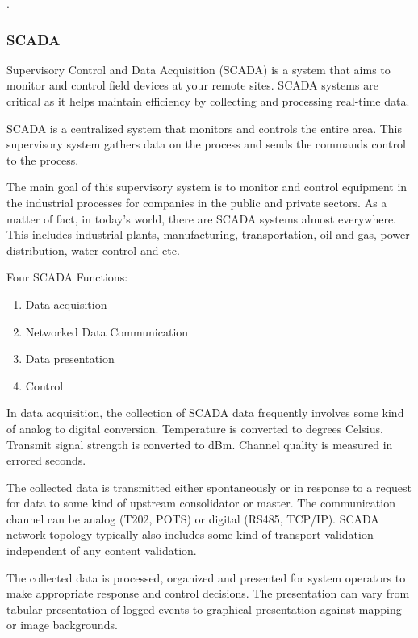  \citep{spadaforaDesigningBehaviorInteractive2016}.

\subsubsection{SCADA}

Supervisory Control and Data Acquisition (SCADA) is a system that aims to monitor and control field devices at your remote sites. SCADA systems are critical as it helps maintain efficiency by collecting and processing real-time data.

SCADA is a centralized system that monitors and controls the entire area. This supervisory system gathers data on the process and sends the commands control to the process.

The main goal of this supervisory system is to monitor and control equipment in the industrial processes for companies in the public and private sectors. As a matter of fact, in today's world, there are SCADA systems almost everywhere. This includes industrial plants, manufacturing, transportation, oil and gas, power distribution, water control and etc.

Four SCADA Functions:

\begin{enumerate}
	\item Data acquisition
	\item Networked Data Communication
	\item Data presentation
	\item Control
\end{enumerate}

In data acquisition, the collection of SCADA data frequently involves some kind of analog to digital conversion. Temperature is converted to degrees Celsius. Transmit signal strength is converted to dBm. Channel quality is measured in errored seconds. 

The collected data is transmitted either spontaneously or in response to a request for data to some kind of upstream consolidator or master. The communication channel can be analog (T202, POTS) or digital (RS485, TCP/IP). SCADA network topology typically also includes some kind of transport validation independent of any content validation.


The collected data is processed, organized and presented for system operators to make appropriate response and control decisions. The presentation can vary from tabular presentation of logged events to graphical presentation against mapping or image backgrounds.

